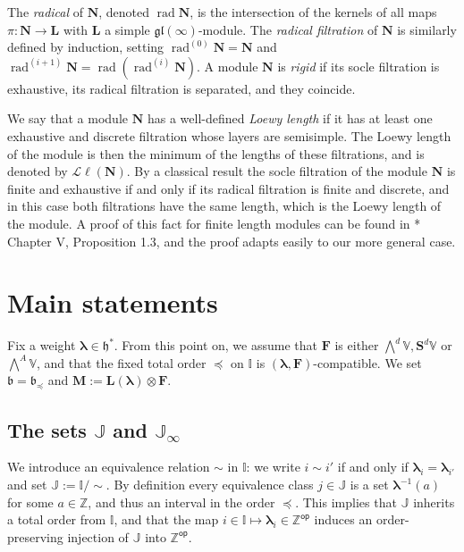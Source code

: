 \documentclass[11pt,fleqn]{amsart}
\newcommand\ZZ{\mathbb Z}
\newcommand\II{\mathbb I}
\newcommand\JJ{\mathbb J}
\renewcommand\to{\longrightarrow}
\theoremstyle{definition}
\theoremstyle{remark}
\theoremstyle{remark}
\newcommand\VV{\mathbb V}
\newcommand\gl{\mathfrak{gl}}
\renewcommand\SS{\mathbf S}
\newcommand\lie[1]{\mathfrak{#1}}
\newcommand\op{\mathsf{op}}
\newcommand\wt[1]{\boldsymbol{#1}}
\DeclareMathOperator\rad{rad}
\begin{document}
The \emph{radical} of $\mathbf N$, denoted $\rad \mathbf N$, is the intersection 
of the kernels of all maps $\pi: \mathbf N \to \mathbf L$ with $\mathbf L$ a 
simple $\gl(\infty)$-module. The \emph{radical filtration} of $\mathbf N$ is 
similarly defined by induction, setting $\rad^{(0)} \mathbf N = 
\mathbf N$ and $\rad^{(i+1)} \mathbf N = \rad \left( \rad^{(i)} 
\mathbf N\right)$.  
A module $\mathbf N$ is \emph{rigid} if its socle filtration is exhaustive, its 
radical filtration is separated, and they coincide.

We say that a module $\mathbf N$ has a well-defined \emph{Loewy length} if it has 
at least one exhaustive and discrete filtration whose layers are semisimple. The 
Loewy length of the module is then the minimum of the lengths of these 
filtrations, and is denoted by $\mathcal L \ell(\mathbf N)$. By a classical 
result the socle filtration of the module $\mathbf N$ is finite and exhaustive 
if and only if its radical filtration is finite and discrete, and in this case 
both filtrations have the same length, which is the Loewy length of the module. 
A proof of this fact for finite length modules can be found in \cite{ASSI}*{
Chapter V, Proposition 1.3}, and the proof adapts easily to our more general 
case.


\section{Main statements}
Fix a weight $\wt\lambda \in \lie h^*$.
From this point on, we assume that $\mathbf F$ is either $\bigwedge^d \VV, 
\SS^d\VV$ or $\bigwedge^{A} \VV$, and that the fixed  total order $\preceq$ 
on $\II$ is $(\wt\lambda, \mathbf F)$-compatible. We set $\lie b = \lie 
b_{\preceq}$ and $\mathbf M := \mathbf L(\wt\lambda) \otimes \mathbf F$.

\subsection{The sets $\JJ$ and $\JJ_{\infty}$}
We introduce an equivalence relation $\sim$ in $\II$: we write $i \sim i'$ if 
and only if $\wt\lambda_i = \wt\lambda_{i'}$ and set $\JJ := \II/\sim$. By 
definition every equivalence class $j \in \JJ$ is a set $\wt\lambda^{-1}(a)$
for some $a \in \ZZ$, and thus an interval in the order $\preceq$. This implies 
that $\JJ$ inherits a total order from $\II$, and that the map $i \in \II 
\mapsto \wt\lambda_i \in \ZZ^\op$ induces an order-preserving injection of 
$\JJ$ into $\ZZ^\op$. 
\end{document}
